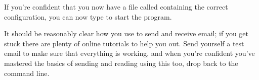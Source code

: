 If you're confident that you now have a file called  containing the correct configuration, you can now type  to start the program. 

It should be reasonably clear how you use  to send and receive email; if you get stuck there are plenty of online tutorials to help you out. Send yourself a test email to make sure that everything is working, and when you're confident you've mastered the basics of sending and reading using this too, drop back to the command line. 

\





